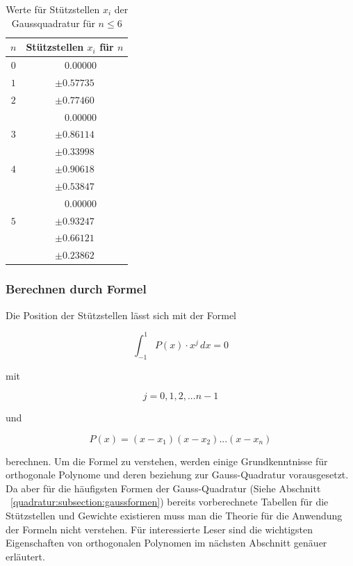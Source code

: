 \begin{table}
    \centering
    \begin{tabular}{|c|c|}
        \hline
        $n$ & Stützstellen $x_{i}$ für $n$ \\
        \hline
        $0$ & $ \phantom{-} 0.00000 $ \\
        \hline
        $1$ & $ \pm 0.57735 $ \\
        \hline
        $2$ & $ \pm 0.77460 $ \\
            & $ \phantom{-} 0.00000 $ \\
        \hline
        $3$ & $ \pm 0.86114 $ \\
            & $ \pm 0.33998 $ \\
        \hline
        $4$ & $ \pm 0.90618 $ \\
            & $ \pm 0.53847 $ \\
            & $ \phantom{-} 0.00000 $ \\
        \hline
        $5$ & $ \pm 0.93247 $ \\
            & $ \pm 0.66121 $ \\
            & $ \pm 0.23862 $ \\
        \hline
    \end{tabular}
    \caption{Werte für Stützstellen $x_{i}$ der Gaussquadratur für $n \leq 6$
    \label{buch:table:gaussabscissenwerte}}    
\end{table}

\subsubsection{Berechnen durch Formel}
Die Position der Stützstellen lässt sich mit der Formel

\begin{equation*}
    \int_{-1}^{1} P(x) \cdot x^{j} \, dx = 0
\end{equation*}

mit

\begin{equation*}
    j = 0, 1, 2, ... n - 1
\end{equation*}

und 

\begin{equation}
    P(x) = (x - x_{1})(x - x_{2}) ... (x - x_{n})
\end{equation}

berechnen. Um die Formel zu verstehen, werden einige Grundkenntnisse für 
orthogonale Polynome und deren beziehung zur Gauss-Quadratur vorausgesetzt.
Da aber für die häufigsten Formen der Gauss-Quadratur 
(Siehe Abschnitt ~\ref{quadratur:subsection:gaussformen}) bereits vorberechnete
Tabellen für die Stützstellen und Gewichte existieren muss man die Theorie
für die Anwendung der Formeln nicht verstehen. Für interessierte Leser sind 
die wichtigsten Eigenschaften von orthogonalen Polynomen im nächsten 
Abschnitt genäuer erläutert.

